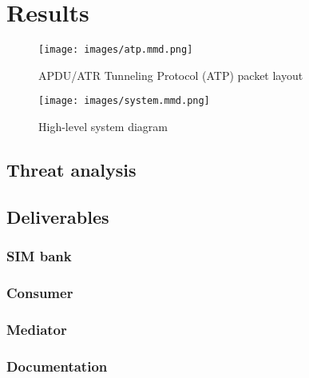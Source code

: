 \chapter{Results}

\begin{figure}[ht]
	\centering
	\texttt{[image: images/atp.mmd.png]}
	\caption{APDU/ATR Tunneling Protocol (ATP) packet layout}
	\label{fig:atp-diagram}
\end{figure}

\begin{figure}[ht]
	\centering
	\texttt{[image: images/system.mmd.png]}
	\caption{High-level system diagram}
	\label{fig:system-diagram}
\end{figure}

\section{Threat analysis}

\section{Deliverables}

\subsection{SIM bank}

\subsection{Consumer}

\subsection{Mediator}

\subsection{Documentation}
